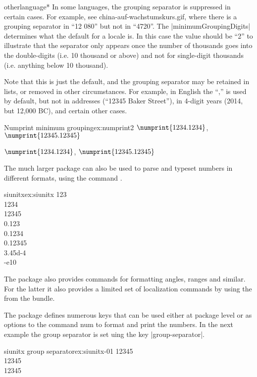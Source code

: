 \begin{docCommandd}{otherlanguage*} { }
In some languages, the grouping separator is suppressed in certain cases. For example, see china-auf-wachstumskurs.gif, where there is a grouping separator in \enquote{12 080} but not in \enquote{4720}. The |minimumGroupingDigits| determines what the default for a locale is. In this case the value should be \enquote{2} to illustrate that the separator only appears once the number of thousands goes into the double-digits (i.e. 10 thousand or above) and not for single-digit thousands (i.e. anything below 10 thousand).


Note that this is just the default, and the grouping separator may be retained in lists, or removed in other circumstances. For example, in English the \enquote{,} is used by default, but not in addresses (\enquote{12345 Baker Street}), in 4-digit years (2014, but 12,000 BC), and certain other cases.

\begin{texexample}{Numprint minimum grouping}{ex:numprint2}
\begingroup
\npfourdigitnosep$\numprint{1234.1234}$, $\numprint{12345.12345}$ 

\npfourdigitsep$\numprint{1234.1234}$, $\numprint{12345.12345}$
\endgroup
\end{texexample}

The much larger package  can also be used to parse and typeset numbers in different formats, using the command .


\begin{texexample}{siunitx}{ex:siunitx}
\num{123}\\
\num{1234}\\
\num{12 345}\\
\num{0.123} \\
\num{0,1234}\\
\num{.12345}\\
\num{3.45d-4}\\
\num{-e10}
\end{texexample}

The package also provides commands for formatting angles, ranges and similar. For the latter it also provides a limited set of localization commands by using the  from the  bundle.

The package defines numerous keys that can be used either at package level or as options to the command num to format and print the numbers. In the next example the group separator is set uing the key |group-separator|. 

\begin{texexample}{siunitx group separator}{ex:siunitx-01}
\num{12345} \\
\num[group-separator = {,}]{12345} \\
\num[group-separator = \text{~}]{12345}
\end{texexample}



\end{docCommandd}
